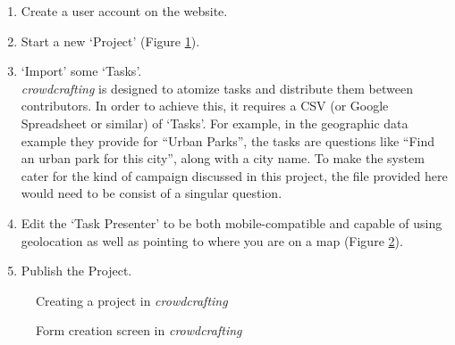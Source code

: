 \documentclass{article}
\begin{document}
		\begin{enumerate}
			\item Create a user account on the website.
			\item Start a new `Project' (Figure \ref{fig:cc-create}).
			\item `Import' some `Tasks'.\\
			\emph{crowdcrafting} is designed to atomize tasks and distribute them between contributors. In order to achieve this, it requires a CSV (or Google Spreadsheet or similar) of `Tasks'. For example, in the geographic data example they provide for ``Urban Parks'', the tasks are questions like ``Find an urban park for this city'', along with a city name\cite{_urban_????}. To make the system cater for the kind of campaign discussed in this project, the file provided here would need to be consist of a singular question.
			\item Edit the `Task Presenter' to be both mobile-compatible and capable of using geolocation as well as pointing to where you are on a map (Figure \ref{fig:cc-present}).
			\item Publish the Project.
		\end{enumerate}

		\begin{figure}[ht]
			\centering
			\caption{Creating a project in \emph{crowdcrafting}}
			\label{fig:cc-create}
		\end{figure}

		\begin{figure}[ht]
			\centering
			\caption{Form creation screen in \emph{crowdcrafting}}
			\label{fig:cc-present}
		\end{figure}
\end{document}
